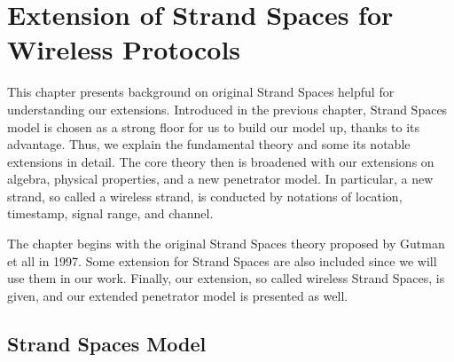 
\chapter{Extension of Strand Spaces for Wireless Protocols} %

\label{Chapter2} %



 
This chapter presents background on original Strand Spaces helpful for understanding our extensions. Introduced in the previous chapter, Strand Spaces model is chosen as a strong floor for us to build our model up, thanks to its advantage. Thus, we explain the fundamental theory and some its notable extensions in detail. The core theory then is broadened with our extensions on algebra, physical properties, and a new penetrator model. In particular, a new strand, so called a wireless strand, is conducted by notations of location, timestamp, signal range, and channel. 

The chapter begins with the original Strand Spaces theory proposed by Gutman et all in 1997. Some extension for Strand Spaces are also included since we will use them in our work. Finally, our extension, so called wireless Strand Spaces, is given, and our extended penetrator model is presented as well. 

\section{Strand Spaces Model}

